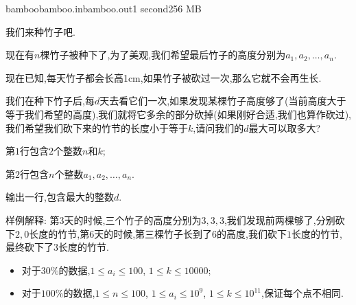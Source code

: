 \documentclass[11pt,a4paper,oneside]{article}
\begin{document}
\begin{problem}{bamboo}{bamboo.in}{bamboo.out}{1 second}{256 MB}
    
    我们来种竹子吧.
    
    现在有$n$棵竹子被种下了,为了美观,我们希望最后竹子的高度分别为$a_1,a_2,\dots,a_n$.
    
    现在已知,每天竹子都会长高1cm,如果竹子被砍过一次,那么它就不会再生长.
    
    我们在种下竹子后,每$d$天去看它们一次,如果发现某棵竹子高度够了(当前高度大于等于我们希望的高度),我们就将它多余的部分砍掉(如果刚好合适,我们也算作砍过),我们希望我们砍下来的竹节的长度小于等于$k$,请问我们的$d$最大可以取多大?

    \InputFile

    第$1$行包含$2$个整数$n$和$k$;
    
    第$2$行包含$n$个整数$a_1,a_2,\dots,a_n$.

    \OutputFile

	输出一行,包含最大的整数$d$.

    \Example

    \begin{example}
    \end{example}

	样例解释: 第$3$天的时候,三个竹子的高度分别为$3, 3, 3$,我们发现前两棵够了,分别砍下$2, 0$长度的竹节,第$6$天的时候,第三棵竹子长到了$6$的高度,我们砍下$1$长度的竹节,最终砍下了$3$长度的竹节.
	
	\begin{example}
	\end{example}

    \Note
    
    \begin{itemize}
    	\item 对于$30\%$的数据,$1 \leq a_i \leq 100$, $1 \leq k \leq 10000$;
        \item 对于$100\%$的数据,$1 \leq n \leq 100$, $1 \leq a_i \leq 10^9$, $1 \leq k \leq 10^{11}$,保证每个点不相同.
    \end{itemize}

\end{problem}
\end{document}
